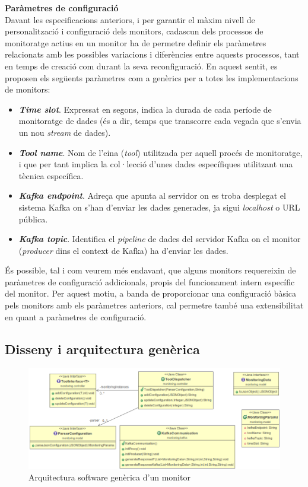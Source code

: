 \noindent \textbf{\large Paràmetres de configuració}\\

\noindent Davant les especificacions anteriors, i per garantir el màxim nivell de personalització i configuració dels monitors, cadascun dels processos de monitoratge actius en un monitor ha de permetre definir els paràmetres relacionats amb les possibles variacions i diferències entre aquests processos, tant en temps de creació com durant la seva reconfiguració. En aquest sentit, es proposen els següents paràmetres com a genèrics per a totes les implementacions de monitors:

\begin{itemize}
\item \textbf{\textit{Time slot}}. Expressat en segons, indica la durada de cada període de monitoratge de dades (és a dir, temps que transcorre cada vegada que s'envia un nou \textit{stream} de dades).
\item \textbf{\textit{Tool name}}. Nom de l'eina (\textit{tool}) utilitzada per aquell procés de monitoratge, i que per tant implica la col·lecció d'unes dades específiques utilitzant una tècnica específica.
\item \textbf{\textit{Kafka endpoint}}. Adreça que apunta al servidor on es troba desplegat el sistema Kafka on s'han d'enviar les dades generades, ja sigui \textit{localhost} o URL pública.
\item \textbf{\textit{Kafka topic}}. Identifica el \textit{pipeline} de dades del servidor Kafka on el monitor (\textit{producer} dins el context de Kafka) ha d'enviar les dades.
\end{itemize}

És possible, tal i com veurem més endavant, que alguns monitors requereixin de paràmetres de configuració addicionals, propis del funcionament intern específic del monitor. Per aquest motiu, a banda de proporcionar una configuració bàsica pels monitors amb els paràmetres anteriors, cal permetre també una extensibilitat en quant a paràmetres de configuració.

\subsection{Disseny i arquitectura genèrica}

\begin{figure}
\centering
\includegraphics[width=14cm]{Figures/Figure5}
\decoRule
\caption[Arquitectura software genèrica d'un monitor]{Arquitectura software genèrica d'un monitor}
\label{fig:Figura5}
\end{figure}


